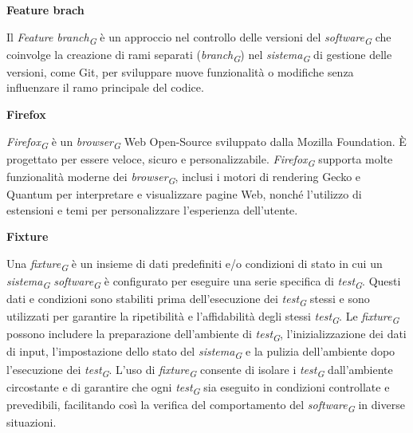 \documentclass{article}
\begin{document}
\vspace{0.4cm}

\textbf{Feature brach}

\vspace{0.1cm}

Il \textit{Feature branch}\textsubscript{\textit{G}} è un approccio nel controllo delle versioni del \textit{software}\textsubscript{\textit{G}} che coinvolge la creazione di rami separati (\textit{branch}\textsubscript{\textit{G}}) nel \textit{sistema}\textsubscript{\textit{G}} di gestione delle versioni, come Git, per sviluppare nuove funzionalità o modifiche senza influenzare il ramo principale del codice.

\vspace{0.4cm}

\textbf{Firefox}

\vspace{0.1cm}

\textit{Firefox}\textsubscript{\textit{G}} è un \textit{browser}\textsubscript{\textit{G}} Web Open-Source sviluppato dalla Mozilla Foundation. È progettato per essere veloce, sicuro e personalizzabile. \textit{Firefox}\textsubscript{\textit{G}} supporta molte funzionalità moderne dei \textit{browser}\textsubscript{\textit{G}}, inclusi i motori di rendering Gecko e Quantum per interpretare e visualizzare pagine Web, nonché l'utilizzo di estensioni e temi per personalizzare l'esperienza dell'utente. 

\vspace{0.4cm}

\textbf{Fixture}

\vspace{0.1cm}

Una \textit{fixture}\textsubscript{\textit{G}} è un insieme di dati predefiniti e/o condizioni di stato in cui un \textit{sistema}\textsubscript{\textit{G}} \textit{software}\textsubscript{\textit{G}} è configurato per eseguire una serie specifica di \textit{test}\textsubscript{\textit{G}}. Questi dati e condizioni sono stabiliti prima dell'esecuzione dei \textit{test}\textsubscript{\textit{G}} stessi e sono utilizzati per garantire la ripetibilità e l'affidabilità degli stessi \textit{test}\textsubscript{\textit{G}}. Le \textit{fixture}\textsubscript{\textit{G}} possono includere la preparazione dell'ambiente di \textit{test}\textsubscript{\textit{G}}, l'inizializzazione dei dati di input, l'impostazione dello stato del \textit{sistema}\textsubscript{\textit{G}} e la pulizia dell'ambiente dopo l'esecuzione dei \textit{test}\textsubscript{\textit{G}}. L'uso di \textit{fixture}\textsubscript{\textit{G}} consente di isolare i \textit{test}\textsubscript{\textit{G}} dall'ambiente circostante e di garantire che ogni \textit{test}\textsubscript{\textit{G}} sia eseguito in condizioni controllate e prevedibili, facilitando così la verifica del comportamento del \textit{software}\textsubscript{\textit{G}} in diverse situazioni.
\end{document}
